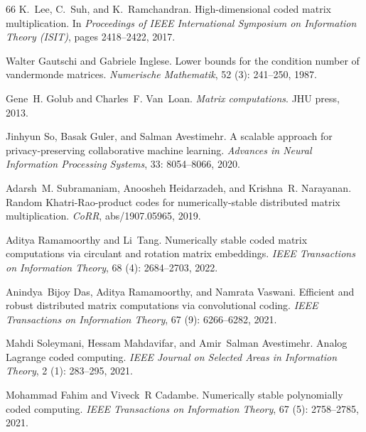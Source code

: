 \documentclass{article}
\begin{document}
\begin{thebibliography}{66}
K.~Lee, C.~Suh, and K.~Ramchandran.
\newblock High-dimensional coded matrix multiplication.
\newblock In \emph{Proceedings of IEEE International Symposium on Information Theory (ISIT)}, pages 2418--2422, 2017.

Walter Gautschi and Gabriele Inglese.
\newblock Lower bounds for the condition number of vandermonde matrices.
\newblock \emph{Numerische Mathematik}, 52 (3): 241--250, 1987.

Gene~H. Golub and Charles~F. Van~Loan.
\newblock \emph{Matrix computations}.
\newblock JHU press, 2013.

Jinhyun So, Basak Guler, and Salman Avestimehr.
\newblock A scalable approach for privacy-preserving collaborative machine learning.
\newblock \emph{Advances in Neural Information Processing Systems}, 33: 8054--8066, 2020{}.

Adarsh~M. Subramaniam, Anoosheh Heidarzadeh, and Krishna~R. Narayanan.
\newblock Random {Khatri-Rao}-product codes for numerically-stable distributed matrix multiplication.
\newblock \emph{CoRR}, abs/1907.05965, 2019.

Aditya Ramamoorthy and Li~Tang.
\newblock Numerically stable coded matrix computations via circulant and rotation matrix embeddings.
\newblock \emph{IEEE Transactions on Information Theory}, 68 (4): 2684--2703, 2022.

Anindya~Bijoy Das, Aditya Ramamoorthy, and Namrata Vaswani.
\newblock Efficient and robust distributed matrix computations via convolutional coding.
\newblock \emph{IEEE Transactions on Information Theory}, 67 (9): 6266--6282, 2021.

Mahdi Soleymani, Hessam Mahdavifar, and Amir~Salman Avestimehr.
\newblock Analog {Lagrange} coded computing.
\newblock \emph{IEEE Journal on Selected Areas in Information Theory}, 2 (1): 283--295, 2021.

Mohammad Fahim and Viveck~R Cadambe.
\newblock Numerically stable polynomially coded computing.
\newblock \emph{IEEE Transactions on Information Theory}, 67 (5): 2758--2785, 2021{}.


\end{thebibliography}
\end{document}
